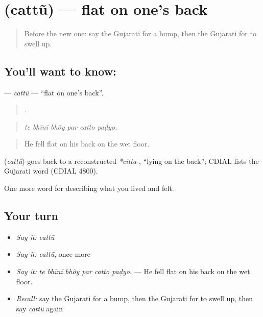 \section[\texorpdfstring{\gu{ચત્તું} (cattũ)}{ચત્તું (cattũ)}]{ (cattũ) — flat on one's back}

\label{lesson:GU-C482-cattu}



\begin{quote}
Before the new one: say the Gujarati for a bump, then the Gujarati for to swell up.
\end{quote}

\subsection*{You'll want to know: }
\textbf{} — \emph{cattũ} — \textquotedblleft{}flat on one's back\textquotedblright{}.

\begin{quote}
     .
\end{quote}

\begin{quote}
\emph{te bhīnī bhõy par catto paḍyo.}
\end{quote}

\begin{quote}
He fell flat on his back on the wet floor.
\end{quote}

\begin{cousinweb}
\textbf{} (\emph{cattũ}) goes back to a reconstructed \emph{*citta-}, \textquotedblleft{}lying on the back\textquotedblright{}; CDIAL lists the Gujarati word (CDIAL 4800).
\end{cousinweb}

\begin{grammarlens}[title={What you've built}]
One more word for describing what you lived and felt.
\end{grammarlens}

\subsection*{Your turn}
\begin{itemize}
\raggedright
  \item \emph{Say it:} \emph{cattũ}
  \item \emph{Say it:} \emph{cattũ}, once more
  \item \emph{Say it:} \emph{te bhīnī bhõy par catto paḍyo.} — He fell flat on his back on the wet floor.
  \item \emph{Recall:} say the Gujarati for a bump, then the Gujarati for to swell up, then say \emph{cattũ} again
\end{itemize}

